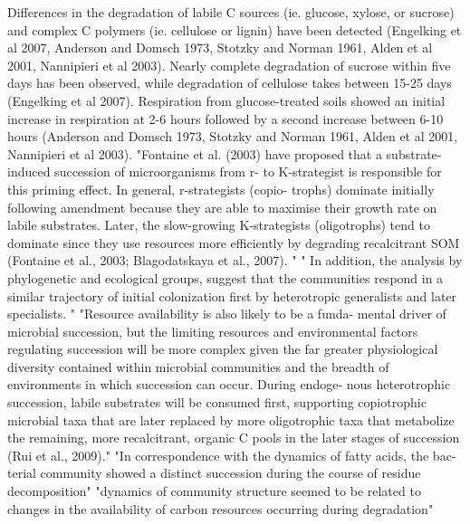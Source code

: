 Differences in the degradation of labile C sources (ie. glucose, xylose, or sucrose) and complex C polymers (ie. cellulose or lignin) have been detected (Engelking et al 2007, Anderson and Domsch 1973, Stotzky and Norman 1961, Alden et al 2001, Nannipieri et al 2003).  Nearly complete degradation of sucrose within five days has been observed, while degradation of cellulose takes between 15-25 days (Engelking et al 2007).  Respiration from glucose-treated soils showed an initial increase in respiration at 2-6 hours followed by a second increase between 6-10 hours (Anderson and Domsch 1973, Stotzky and Norman 1961, Alden et al 2001, Nannipieri et al 2003).  
"Fontaine et al. (2003) have proposed that a substrate- induced succession of microorganisms from r- to K-strategist is responsible for this priming effect. In general, r-strategists (copio- trophs) dominate initially following amendment because they are able to maximise their growth rate on labile substrates. Later, the slow-growing K-strategists (oligotrophs) tend to dominate since they use resources more efficiently by degrading recalcitrant SOM
(Fontaine et al., 2003; Blagodatskaya et al., 2007). " \cite{Jenkins_2010}
" In addition, the analysis by phylogenetic and ecological groups, suggest that the communities respond in a similar trajectory of initial colonization first by heterotropic generalists and later specialists. "\cite{L_pez_Lozano_2013}
"Resource availability is also likely to be a funda- mental driver of microbial succession, but the limiting resources and environmental factors regulating succession will be more complex given the far greater physiological diversity contained within microbial communities and the breadth of environments in which succession can occur. During endoge- nous heterotrophic succession, labile substrates will be consumed first, supporting copiotrophic microbial taxa that are later replaced by more oligotrophic taxa that metabolize the remaining, more recalcitrant, organic C pools in the later stages of succession (Rui et al., 2009)."\cite{Fierer_2010}
"In correspondence with the dynamics of fatty acids, the bac- terial community showed a distinct succession during the course of residue decomposition"\cite{Rui_2009}
"dynamics of community structure seemed to be related to changes in the availability of carbon resources occurring during degradation"\cite{Bastian_2009}


